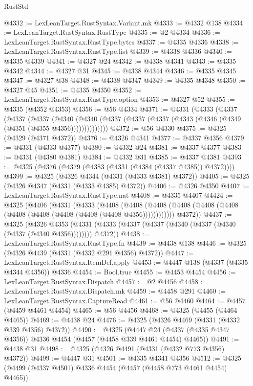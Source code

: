 \begin{lexlean}{RustStd}
\begin{coremodule}
@4332 := LexLeanTarget.RustSyntax.Variant.mk
@4333 := @4332 @138
@4334 := LexLeanTarget.RustSyntax.RustType
@4335 := @2 @4334
@4336 := LexLeanTarget.RustSyntax.RustType.bytes
@4337 := @4335 @4336
@4338 := LexLeanTarget.RustSyntax.RustType.list
@4339 := @4338 @4336
@4340 := @4335 @4339
@4341 := @4327 @24
@4342 := @4338 @4341
@4343 := @4335 @4342
@4344 := @4327 @31
@4345 := @4338 @4344
@4346 := @4335 @4345
@4347 := @4327 @38
@4348 := @4338 @4347
@4349 := @4335 @4348
@4350 := @4327 @45
@4351 := @4335 @4350
@4352 := LexLeanTarget.RustSyntax.RustType.option
@4353 := @4327 @52
@4355 := @4335 (@4352 @4353)
@4356 := @56 @4334
@4371 := @4331
    (@4333
      (@4337
        (@4337
          (@4337
            (@4340
              (@4340 (@4337 (@4337 (@4337 (@4343 (@4346 (@4349 (@4351 (@4355 @4356))))))))))))))
@4372 := @56 @4330
@4375 := @4325 (@4329 (@4371 @4372))
@4376 := @4326 @4341
@4377 := @4337 @4356
@4379 := @4331 (@4333 @4377)
@4380 := @4332 @24
@4381 := @4337 @4377
@4383 := @4331 (@4380 @4381)
@4384 := @4332 @31
@4385 := @4337 @4381
@4393 := @4325 (@4376 (@4379 (@4383 (@4331 (@4384 (@4337 @4385)) @4372))))
@4399 := @4325 (@4326 @4344 (@4331 (@4333 @4381) @4372))
@4405 := @4325 (@4326 @4347 (@4331 (@4333 @4385) @4372))
@4406 := @4326 @4350
@4407 := LexLeanTarget.RustSyntax.RustType.nat
@4408 := @4335 @4407
@4424 := @4325
    (@4406
      (@4331
        (@4333
          (@4408
            (@4408 (@4408 (@4408 (@4408 (@4408 (@4408 (@4408 (@4408 (@4408 (@4408 @4356))))))))))))
        @4372))
@4437 := @4325
    (@4326
      @4353
      (@4331 (@4333 (@4337 (@4337 (@4340 (@4337 (@4340 (@4337 (@4340 @4356)))))))) @4372))
@4438 := LexLeanTarget.RustSyntax.RustType.fn
@4439 := @4438 @138
@4446 := @4325 (@4326 @4439 (@4331 (@4332 @291 @4356) @4372))
@4447 := LexLeanTarget.RustSyntax.ItemDef.apply
@4453 := @4447 @138 (@4337 (@4335 @4344 @4356)) @4336
@4454 := Bool.true
@4455 := @4453 @4454
@4456 := LexLeanTarget.RustSyntax.Dispatch
@4457 := @2 @4456
@4458 := LexLeanTarget.RustSyntax.Dispatch.mk
@4459 := @4458 @291
@4460 := LexLeanTarget.RustSyntax.CaptureRead
@4461 := @56 @4460
@4464 := @4457 (@4459 @4461 @4454)
@4465 := @56 @4456
@4468 := @4325 (@4455 (@4464 @4465))
@4469 := @4438 @24
@4476 := @4325 (@4326 @4469 (@4331 (@4332 @339 @4356) @4372))
@4490 := @4325
    (@4447 @24 (@4337 (@4335 @4347 @4356)) @4336 @4454 (@4457 (@4458 @339 @4461 @4454) @4465))
@4491 := @4438 @31
@4498 := @4325 (@4326 @4491 (@4331 (@4332 @773 @4356) @4372))
@4499 := @4447 @31
@4501 := @4335 @4341 @4356
@4512 := @4325 (@4499 (@4337 @4501) @4336 @4454 (@4457 (@4458 @773 @4461 @4454) @4465))

\end{coremodule}
\end{lexlean}
